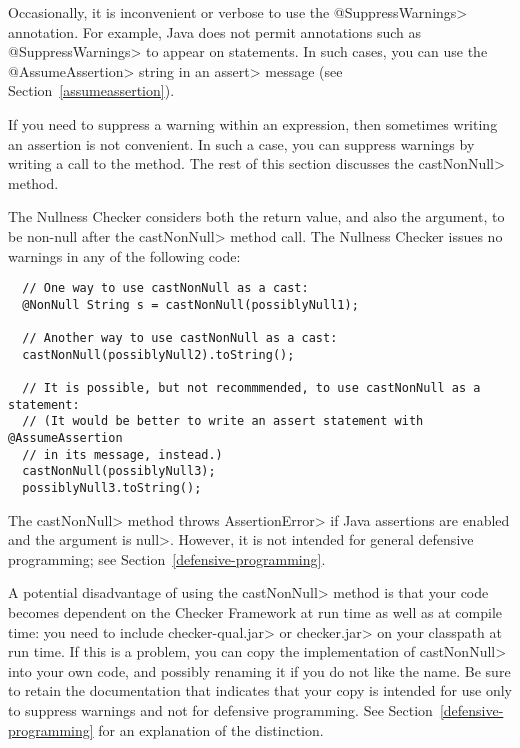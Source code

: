 Occasionally, it is inconvenient or
verbose to use the \<@SuppressWarnings> annotation.  For example, Java does
not permit annotations such as \<@SuppressWarnings> to appear on statements.
In such cases, you can use the \<@AssumeAssertion> string in
an \<assert> message (see Section~\ref{assumeassertion}).

If you need to suppress a warning within an expression, then
sometimes writing an assertion is not convenient.  In such a case,
you can suppress warnings by writing a call to the
 method.
The rest of this section discusses the \<castNonNull> method.

The Nullness Checker considers both the return value, and also the
argument, to be non-null after the \<castNonNull> method call.
The Nullness Checker issues no warnings in any of the following
code:

\begin{Verbatim}
  // One way to use castNonNull as a cast:
  @NonNull String s = castNonNull(possiblyNull1);

  // Another way to use castNonNull as a cast:
  castNonNull(possiblyNull2).toString();

  // It is possible, but not recommmended, to use castNonNull as a statement:
  // (It would be better to write an assert statement with @AssumeAssertion
  // in its message, instead.)
  castNonNull(possiblyNull3);
  possiblyNull3.toString();
\end{Verbatim}

  The \<castNonNull> method throws \<AssertionError> if Java assertions are enabled and
  the argument is \<null>.  However, it is not intended for general defensive
  programming; see Section~\ref{defensive-programming}.

  A potential disadvantage of using the \<castNonNull> method is that your
  code becomes dependent on the Checker Framework at run time as well as at
  compile time:  you need to include \<checker-qual.jar>
  or \<checker.jar> on your classpath at run time.
  If this is a problem, you can copy the implementation of
  \<castNonNull> into your own code, and possibly renaming it if you do not
  like the name.  Be sure to retain the documentation that indicates that
  your copy is intended for use only to suppress warnings and not for
  defensive programming.  See Section~\ref{defensive-programming} for an
  explanation of the distinction.


